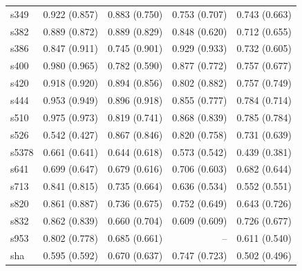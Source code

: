 \begin{tabular}{@{}lrrrr@{}}
s349 & 0.922 (0.857) & 0.883 (0.750) & 0.753 (0.707) & 0.743 (0.663) \\
s382 & 0.889 (0.872) & 0.889 (0.829) & 0.848 (0.620) & 0.712 (0.655) \\
s386 & 0.847 (0.911) & 0.745 (0.901) & 0.929 (0.933) & 0.732 (0.605) \\
s400 & 0.980 (0.965) & 0.782 (0.590) & 0.877 (0.772) & 0.757 (0.677) \\
s420 & 0.918 (0.920) & 0.894 (0.856) & 0.802 (0.882) & 0.757 (0.749) \\
s444 & 0.953 (0.949) & 0.896 (0.918) & 0.855 (0.777) & 0.784 (0.714) \\
s510 & 0.975 (0.973) & 0.819 (0.741) & 0.868 (0.839) & 0.785 (0.784) \\
s526 & 0.542 (0.427) & 0.867 (0.846) & 0.820 (0.758) & 0.731 (0.639) \\
s5378 & 0.661 (0.641) & 0.644 (0.618) & 0.573 (0.542) & 0.439 (0.381) \\
s641 & 0.699 (0.647) & 0.679 (0.616) & 0.706 (0.603) & 0.682 (0.644) \\
s713 & 0.841 (0.815) & 0.735 (0.664) & 0.636 (0.534) & 0.552 (0.551) \\
s820 & 0.861 (0.887) & 0.736 (0.675) & 0.752 (0.649) & 0.643 (0.726) \\
s832 & 0.862 (0.839) & 0.660 (0.704) & 0.609 (0.609) & 0.726 (0.677) \\
s953 & 0.802 (0.778) & 0.685 (0.661) & -- & 0.611 (0.540) \\
sha & 0.595 (0.592) & 0.670 (0.637) & 0.747 (0.723) & 0.502 (0.496) \\
\bottomrule
\end{tabular}
